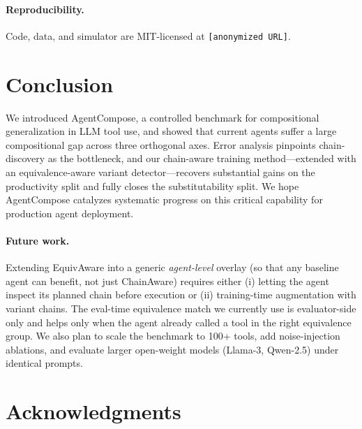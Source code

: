 \documentclass[10pt]{article}
\begin{document}
\paragraph{Reproducibility.} Code, data, and simulator are MIT-licensed at \texttt{[anonymized URL]}.

\section{Conclusion}
\label{sec:conclusion}

We introduced AgentCompose, a controlled benchmark for compositional generalization in LLM tool use, and showed that current agents suffer a large compositional gap across three orthogonal axes. Error analysis pinpoints chain-discovery as the bottleneck, and our chain-aware training method---extended with an equivalence-aware variant detector---recovers substantial gains on the productivity split and fully closes the substitutability split. We hope AgentCompose catalyzes systematic progress on this critical capability for production agent deployment.

\paragraph{Future work.} Extending EquivAware into a generic \emph{agent-level} overlay (so that any baseline agent can benefit, not just ChainAware) requires either (i) letting the agent inspect its planned chain before execution or (ii) training-time augmentation with variant chains. The eval-time equivalence match we currently use is evaluator-side only and helps only when the agent already called a tool in the right equivalence group. We also plan to scale the benchmark to 100+ tools, add noise-injection ablations, and evaluate larger open-weight models (Llama-3, Qwen-2.5) under identical prompts.

\section*{Acknowledgments}
\end{document}
